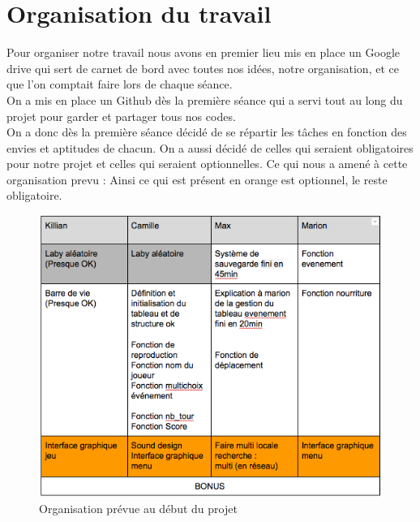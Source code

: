 \documentclass[12pt,a4paper,twoside]{article}
\begin{document}
\section{Organisation du travail}
Pour organiser notre travail nous avons en premier lieu mis en place un Google drive qui sert de carnet de bord avec toutes nos idées, notre organisation, et ce que l'on comptait faire lors de chaque séance.\\
On a mis en place un Github dès la première séance qui a servi tout au long du projet pour garder et partager tous nos codes.
\\On a donc dès la première séance décidé de se répartir les tâches en fonction des envies et aptitudes de chacun. On a aussi décidé de celles qui seraient obligatoires pour notre projet et celles qui seraient optionnelles. Ce qui nous a amené à cette organisation prevu :
Ainsi ce qui est présent en orange est optionnel, le reste obligatoire. \\
\begin {figure}[h]
\includegraphics[width=1\textwidth]{prevision.png}
\caption{\label {ref2}Organisation prévue au début du projet}
\end {figure}
\end{document}
